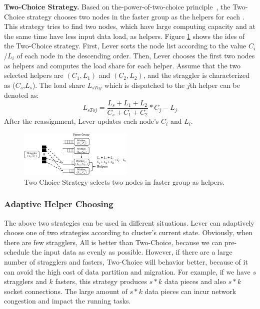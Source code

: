 \textbf{Two-Choice Strategy.} Based on
the-power-of-two-choice principle~\cite{Mitzenmacher1996}, the Two-Choice strategy
chooses two nodes in the faster group as the helpers for each . This strategy tries to find
two nodes, which have large computing capacity and at the same time have less
input data load, as helpers.  Figure \ref{Fig. 9:} shows the ides of the
Two-Choice strategy. First, Lever sorts the node
list according to the value \emph{$C_i$}/\emph{$L_i$} of each node in the descending order.
Then, Lever chooses the first two nodes as helpers and computes the load share for
each helper. Assume that the two selected helpers are $(C_1, L_1)$ and $(C_2,
L_2)$, and the straggler is characterized as (\emph{$C_s$},\emph{$L_s$}). The load
share \emph{{$L_{sToj}$}} which is dispatched to the $j$th helper can be denoted as:
  \begin{equation}
  L_{sToj} = \frac{L_s + L_1 + L_2}{C_s + C_1 + C_2}*C_j - L_j
  \end{equation}
After the reassignment, Lever updates each node's $C_i$ and $L_i$.
  \begin{figure}[htbp]
    \centering
    \includegraphics[width=0.48\textwidth]{FigureS2}
    \caption{Two Choice Strategy selects two nodes in faster group as helpers.}
    \label{Fig. 9:}
  \end{figure}

\subsubsection{Adaptive Helper Choosing}

The above two strategies can be used in different situations. Lever can
adaptively choose one of two strategies according to cluster's current state.
Obviously, when there are few stragglers, All is better than 
Two-Choice, because we can pre-schedule the input data as evenly as
possible.  However, if there are a large number of stragglers and fasters,
Two-Choice will behavior better, because of it can avoid the high cost of data
partition and migration. For example, if we have $s$ stragglers and $k$ fasters, this
strategy produces $s*k$ data pieces and also $s*k$ socket connections. The large
amount of $s*k$ data pieces can incur network congestion and impact the running
tasks. 

